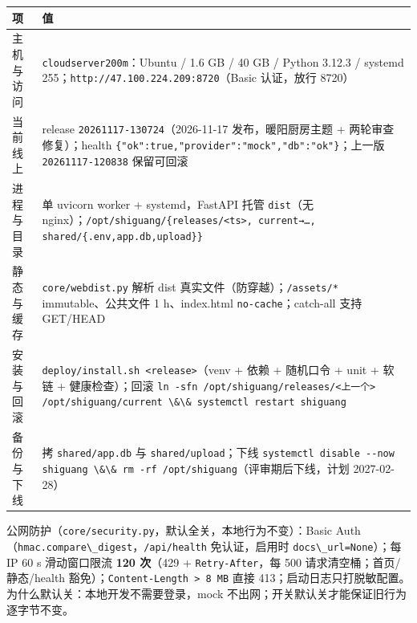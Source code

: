 {\def\LTcaptype{none} %
\begin{longtable}[]{@{}
  >{\raggedright\arraybackslash}p{}
  >{\raggedright\arraybackslash}p{}@{}}
\toprule\noalign{}
\begin{minipage}[b]{\linewidth}\raggedright
项
\end{minipage} & \begin{minipage}[b]{\linewidth}\raggedright
值
\end{minipage} \\
\midrule\noalign{}
\endhead
\bottomrule\noalign{}
\endlastfoot
主机与访问 & \passthrough{\lstinline!cloudserver200m!}：Ubuntu / 1.6 GB
/ 40 GB / Python 3.12.3 / systemd
255；\passthrough{\lstinline!http://47.100.224.209:8720!}（Basic
认证，放行 8720） \\
当前线上 & release \passthrough{\lstinline!20261117-130724!}（2026-11-17
发布，暖阳厨房主题 + 两轮审查修复）；health
\passthrough{\lstinline!\{"ok":true,"provider":"mock","db":"ok"\}!}；上一版
\passthrough{\lstinline!20261117-120838!} 保留可回滚 \\
进程与目录 & 单 uvicorn worker + systemd，FastAPI 托管
\passthrough{\lstinline!dist!}（无
nginx）；\passthrough{\lstinline!/opt/shiguang/\{releases/<ts>, current→…, shared/\{.env,app.db,upload\}\}!} \\
静态与缓存 & \passthrough{\lstinline!core/webdist.py!} 解析 dist
真实文件（防穿越）；\passthrough{\lstinline!/assets/*!}
immutable、公共文件 1 h、index.html
\passthrough{\lstinline!no-cache!}；catch-all 支持 GET/HEAD \\
安装与回滚 & \passthrough{\lstinline!deploy/install.sh <release>!}（venv
+ 依赖 + 随机口令 + unit + 软链 + 健康检查）；回滚
\passthrough{\lstinline!ln -sfn /opt/shiguang/releases/<上一个> /opt/shiguang/current \&\& systemctl restart shiguang!} \\
备份与下线 & 拷 \passthrough{\lstinline!shared/app.db!} 与
\passthrough{\lstinline!shared/upload!}；下线
\passthrough{\lstinline!systemctl disable --now shiguang \&\& rm -rf /opt/shiguang!}（评审期后下线，计划
2027-02-28） \\
\end{longtable}
}

公网防护（\passthrough{\lstinline!core/security.py!}，默认全关，本地行为不变）：Basic
Auth（\passthrough{\lstinline!hmac.compare\_digest!}，\passthrough{\lstinline!/api/health!}
免认证，启用时 \passthrough{\lstinline!docs\_url=None!}）；每 IP 60 s
滑动窗口限流 \textbf{120 次}（429 +
\passthrough{\lstinline!Retry-After!}，每 500
请求清空桶；首页/静态/health
豁免）；\passthrough{\lstinline!Content-Length > 8 MB!} 直接
413；启动日志只打脱敏配置。为什么默认关：本地开发不需要登录，mock
不出网；开关默认关才能保证旧行为逐字节不变。

